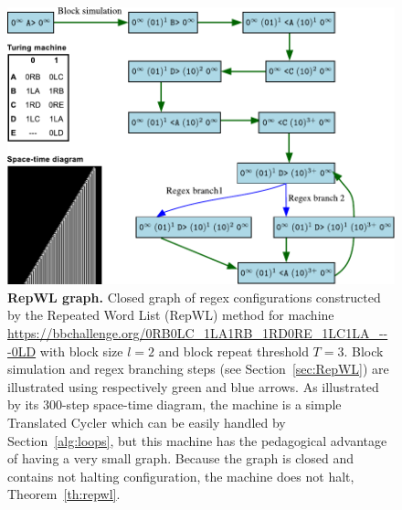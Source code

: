 
\newpage

\begin{figure}[h!]
    \centering
    \includegraphics[scale=0.77]{figures/RepWL/RepWL_graph.pdf}
    \caption{{\small \textbf{RepWL graph.} Closed graph of regex configurations constructed by the Repeated Word List (RepWL) method for machine \url{https://bbchallenge.org/0RB0LC_1LA1RB_1RD0RE_1LC1LA_---0LD} with block size $l=2$ and block repeat threshold $T=3$. Block simulation and regex branching steps (see Section~\ref{sec:RepWL}) are illustrated using respectively green and blue arrows. As illustrated by its 300-step space-time diagram, the machine is a simple Translated Cycler which can be easily handled by Section~\ref{alg:loops}, but this machine has the pedagogical advantage of having a very small graph. Because the graph is closed and contains not halting configuration, the machine does not halt, Theorem~\ref{th:repwl}.}}\label{fig:repWL}
\end{figure}

